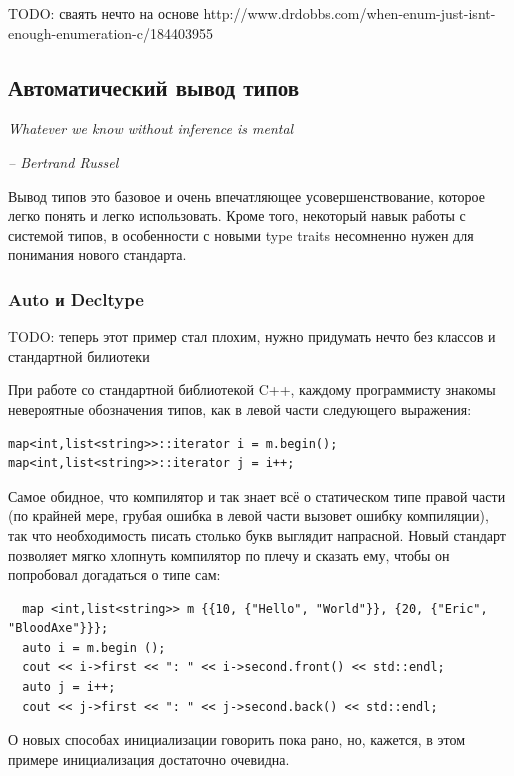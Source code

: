 \documentclass[a4paper,12pt,oneside]{article}
\begin{document}
TODO: сваять нечто на основе http://www.drdobbs.com/when-enum-just-isnt-enough-enumeration-c/184403955

\pagebreak
\subsection{Автоматический вывод типов}\label{TypeInference}

\hfill\textit{Whatever we know without inference is mental}{\vspace{0.5em}}

\hfill\textit{-- Bertrand Russel}

Вывод типов это базовое и очень впечатляющее усовершенствование, которое легко понять и легко использовать. Кроме того, некоторый навык работы с системой типов, в особенности с новыми type traits несомненно нужен для понимания нового стандарта.

\subsubsection{Auto и Decltype}\label{DecltypeAuto}

TODO: теперь этот пример стал плохим, нужно придумать нечто без классов и стандартной билиотеки

При работе со стандартной библиотекой C++, каждому программисту знакомы невероятные обозначения типов, как в левой части следующего выражения:

\begin{lstlisting}
map<int,list<string>>::iterator i = m.begin(); 
map<int,list<string>>::iterator j = i++; 
\end{lstlisting}

Самое обидное, что компилятор и так знает всё о статическом типе правой части (по крайней мере, грубая ошибка в левой части вызовет ошибку компиляции), так что необходимость писать столько букв выглядит напрасной. Новый стандарт позволяет мягко хлопнуть компилятор по плечу и сказать ему, чтобы он попробовал догадаться о типе сам:

\begin{lstlisting}
  map <int,list<string>> m {{10, {"Hello", "World"}}, {20, {"Eric", "BloodAxe"}}};
  auto i = m.begin ();
  cout << i->first << ": " << i->second.front() << std::endl;
  auto j = i++;
  cout << j->first << ": " << j->second.back() << std::endl;
\end{lstlisting}

О новых способах инициализации говорить пока рано, но, кажется, в этом примере инициализация достаточно очевидна.
\end{document}
